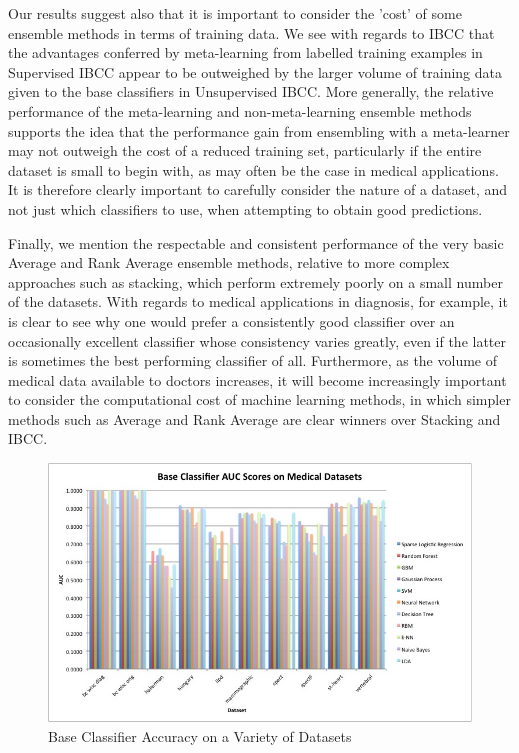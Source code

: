 \documentclass{bioinfo}
\begin{document}
\vspace{0.2cm}
\noindent
Our results suggest also that it is important to consider the 'cost' of some ensemble methods in terms of training data. We see with regards to IBCC that the advantages conferred by meta-learning from labelled training examples in Supervised IBCC appear to be outweighed by the larger volume of training data given to the base classifiers in Unsupervised IBCC. More generally, the relative performance of the meta-learning and non-meta-learning ensemble methods supports the idea that the performance gain from ensembling with a meta-learner may not outweigh the cost of a reduced training set, particularly if the entire dataset is small to begin with, as may often be the case in medical applications. It is therefore clearly important to carefully consider the nature of a dataset, and not just which classifiers to use, when attempting to obtain good predictions.

\vspace{0.2cm}
\noindent
Finally, we mention the respectable and consistent performance of the very basic Average and Rank Average ensemble methods, relative to more complex approaches such as stacking, which perform extremely poorly on a small number of the datasets. With regards to medical applications in diagnosis, for example, it is clear to see why one would prefer a consistently good classifier over an occasionally excellent classifier whose consistency varies greatly, even if the latter is sometimes the best performing classifier of all. Furthermore, as the volume of medical data available to doctors increases, it will become increasingly important to consider the computational cost of machine learning methods, in which simpler methods such as Average and Rank Average are clear winners over Stacking and IBCC.

\clearpage

\begin{figure}[p]
\centering
\includegraphics[angle=270]{basegraph.jpg}
\caption{Base Classifier Accuracy on a Variety of Datasets}
\label{fig:01}
\end{figure}
\end{document}
